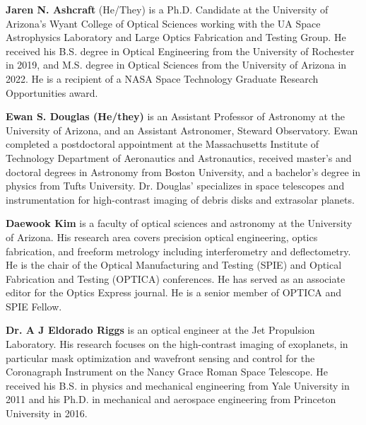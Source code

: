 \documentclass[12pt]{spieman}  %
\begin{document}
\begin{spacing}{2}
\vspace{2ex}\noindent\textbf{Jaren N. Ashcraft} (He/They) is a Ph.D. Candidate at the University of Arizona's Wyant College of Optical Sciences working with the UA Space Astrophysics Laboratory and Large Optics Fabrication and Testing Group. He received his B.S. degree in Optical Engineering from the University of Rochester in 2019, and M.S. degree in Optical Sciences from the University of Arizona in 2022. He is a recipient of a NASA Space Technology Graduate Research Opportunities award.


\vspace{2ex}\noindent\textbf{Ewan S. Douglas (He/they)}  is an Assistant Professor of Astronomy at the University of Arizona, and an Assistant Astronomer, Steward Observatory. Ewan completed a postdoctoral appointment at the Massachusetts Institute of Technology Department of Aeronautics and Astronautics, received master's and doctoral degrees in Astronomy from Boston University, and a bachelor's degree in physics from Tufts University.  Dr. Douglas' specializes in space telescopes and instrumentation for high-contrast imaging of debris disks and extrasolar planets.

\vspace{2ex}\noindent\textbf{Daewook Kim} is a faculty of optical sciences and astronomy at the University of Arizona. His research area covers precision optical engineering, optics fabrication, and freeform metrology including interferometry and deflectometry. He is the chair of the Optical Manufacturing and Testing (SPIE) and Optical Fabrication and Testing (OPTICA) conferences. He has served as an associate editor for the Optics Express journal. He is a senior member of OPTICA and SPIE Fellow.

\vspace{2ex}\noindent\textbf{Dr. A J Eldorado Riggs} is an optical engineer at the Jet Propulsion Laboratory. His research focuses on the high-contrast imaging of exoplanets, in particular mask optimization and wavefront sensing and control for the Coronagraph Instrument on the Nancy Grace Roman Space Telescope. He received his B.S. in physics and mechanical engineering from Yale University in 2011 and his Ph.D. in mechanical and aerospace engineering from Princeton University in 2016.


\vspace{1ex}

\listoffigures
\listoftables

\end{spacing}
\end{document}
